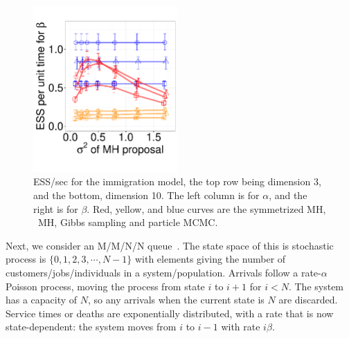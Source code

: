 \begin{figure}
\begin{minipage}[hp]{0.69\linewidth}
    \includegraphics [width=0.49\textwidth, angle=0]{figs/q_10_beta.pdf}
    \vspace{-0.1 in}
  \end{minipage}
  \begin{minipage}[!hp]{0.3\linewidth}
    \caption{ESS/sec for the immigration model, the top row being dimension 3, and the bottom,
      dimension 10. The left column is for $\alpha$, and the 
    right is for $\beta$. Red, yellow, and blue curves are the symmetrized MH,
  \naive\ MH, Gibbs sampling and particle MCMC.}
     \label{fig:ESS_Q_D10}
  \end{minipage}
  \end{figure}
Next, we consider an M/M/N/N queue~\citep{gross2011fundamentals}. The state space of this is stochastic 
process is $\{0, 1, 2, 3, \cdots, N - 1\}$ with 
elements giving the number of customers/jobs/individuals in a system/population. 
Arrivals follow a rate-$\alpha$ Poisson process, moving the process from state 
$i$ to $i+1$ for $i<N$. The system has a capacity of $N$, so any arrivals when 
the current state is $N$ are discarded.  Service times or deaths are 
exponentially distributed, with a rate that is now state-dependent:
the system moves from $i$ to $i - 1$ with rate $i\beta$. 




